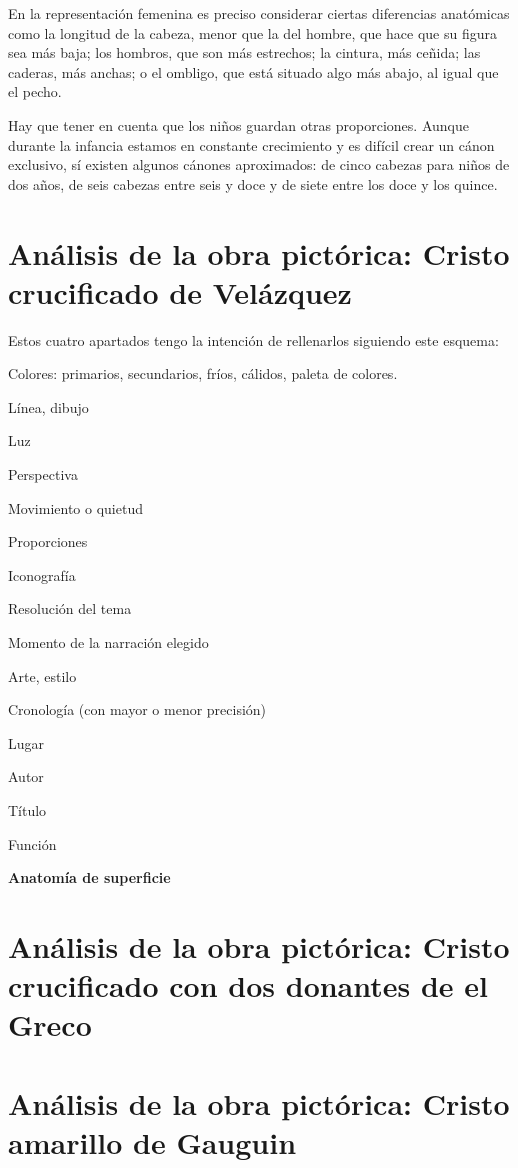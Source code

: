 \documentclass[a4paper,12pt]{article} %
\begin{document}
En la representación femenina es preciso considerar ciertas diferencias anatómicas como la longitud de la cabeza, menor que la del hombre, que hace que su figura sea más baja; los hombros, que son más estrechos; la cintura, más ceñida; las caderas, más anchas; o el ombligo, que está situado algo más abajo, al igual que el pecho.

Hay que tener en cuenta que los niños guardan otras proporciones. Aunque durante la infancia estamos en constante crecimiento y es difícil crear un cánon exclusivo, sí existen algunos cánones aproximados: de cinco cabezas para niños de dos años, de seis cabezas entre seis y doce y de siete entre los doce y los quince.


\newpage

\section{Análisis de la obra pictórica: Cristo crucificado de Velázquez } 

Estos cuatro apartados tengo la intención de rellenarlos siguiendo este esquema:

Colores: primarios, secundarios, fríos, cálidos, paleta de colores.

Línea, dibujo

Luz

Perspectiva

Movimiento o quietud

Proporciones

Iconografía

Resolución del tema

Momento de la narración elegido

Arte, estilo

Cronología (con mayor o menor precisión)

Lugar

Autor

Título

Función 

\textbf{Anatomía de superficie}
\section{Análisis de la obra pictórica: Cristo crucificado con dos donantes de el Greco}
\section{Análisis de la obra pictórica: Cristo amarillo de Gauguin}
\end{document}
